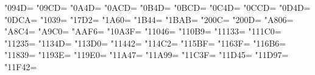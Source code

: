\def\intercharignore#1{}
\newXeTeXintercharclass\KclassVir
\newXeTeXintercharclass\KclassCM
\newXeTeXintercharclass\KclassNum
\newXeTeXintercharclass\KclassArabL
\newXeTeXintercharclass\KclassArabR
\newXeTeXintercharclass\KclassArabD
\newXeTeXintercharclass\KclassArabU
\newXeTeXintercharclass\KclassIgnore

\XeTeXcharclass"094D=\KclassVir
\XeTeXcharclass"09CD=\KclassVir
\XeTeXcharclass"0A4D=\KclassVir
\XeTeXcharclass"0ACD=\KclassVir
\XeTeXcharclass"0B4D=\KclassVir
\XeTeXcharclass"0BCD=\KclassVir
\XeTeXcharclass"0C4D=\KclassVir
\XeTeXcharclass"0CCD=\KclassVir
\XeTeXcharclass"0D4D=\KclassVir
\XeTeXcharclass"0DCA=\KclassVir
\XeTeXcharclass"1039=\KclassVir
\XeTeXcharclass"17D2=\KclassVir
\XeTeXcharclass"1A60=\KclassVir
\XeTeXcharclass"1B44=\KclassVir
\XeTeXcharclass"1BAB=\KclassVir
\XeTeXcharclass"200C=\KclassVir
\XeTeXcharclass"200D=\KclassVir
\XeTeXcharclass"A806=\KclassVir
\XeTeXcharclass"A8C4=\KclassVir
\XeTeXcharclass"A9C0=\KclassVir
\XeTeXcharclass"AAF6=\KclassVir
\XeTeXcharclass"10A3F=\KclassVir
\XeTeXcharclass"11046=\KclassVir
\XeTeXcharclass"110B9=\KclassVir
\XeTeXcharclass"11133=\KclassVir
\XeTeXcharclass"111C0=\KclassVir
\XeTeXcharclass"11235=\KclassVir
\XeTeXcharclass"1134D=\KclassVir
\XeTeXcharclass"113D0=\KclassVir
\XeTeXcharclass"11442=\KclassVir
\XeTeXcharclass"114C2=\KclassVir
\XeTeXcharclass"115BF=\KclassVir
\XeTeXcharclass"1163F=\KclassVir
\XeTeXcharclass"116B6=\KclassVir
\XeTeXcharclass"11839=\KclassVir
\XeTeXcharclass"1193E=\KclassVir
\XeTeXcharclass"119E0=\KclassVir
\XeTeXcharclass"11A47=\KclassVir
\XeTeXcharclass"11A99=\KclassVir
\XeTeXcharclass"11C3F=\KclassVir
\XeTeXcharclass"11D45=\KclassVir
\XeTeXcharclass"11D97=\KclassVir
\XeTeXcharclass"11F42=\KclassVir


